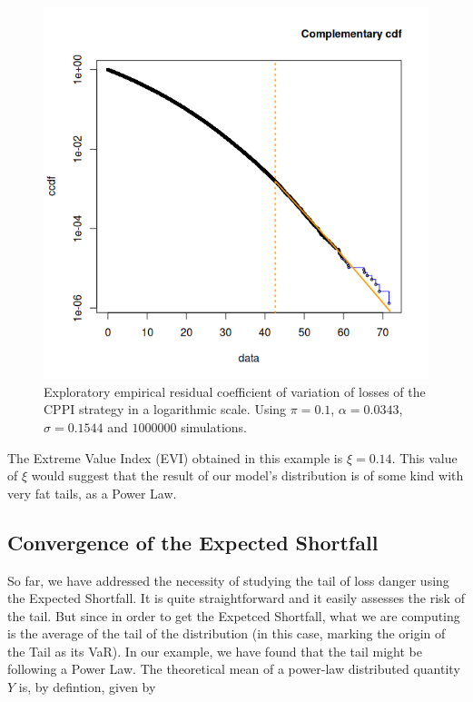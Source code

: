 \begin{figure}[h]
    \centering
    \includegraphics[scale=0.75]{images/cppi-ccdf-autothresh.png}
    \caption{Exploratory empirical residual coefficient of variation of losses of the CPPI strategy in a logarithmic scale. Using $\pi = 0.1$, $\alpha = 0.0343$, $\sigma = 0.1544$ and $1000000$ simulations.}
    \label{fig:cppi-ccdf-autothresh}
\end{figure}

The Extreme Value Index (EVI) obtained in this example is $\xi = 0.14$. This value of $\xi$ would suggest that the result of our model's distribution is of some kind with very fat tails, as a Power Law.

\subsection{Convergence of the Expected Shortfall}

So far, we have addressed the necessity of studying the tail of loss danger using the Expected Shortfall. It is quite straightforward and it easily assesses the risk of the tail. But since in order to get the Expetced Shortfall, what we are computing is the average of the tail of the distribution (in this case, marking the origin of the Tail as its VaR). In our example, we have found that the tail might be following a Power Law. The theoretical mean of a power-law distributed quantity $Y$ is, by defintion, given by

